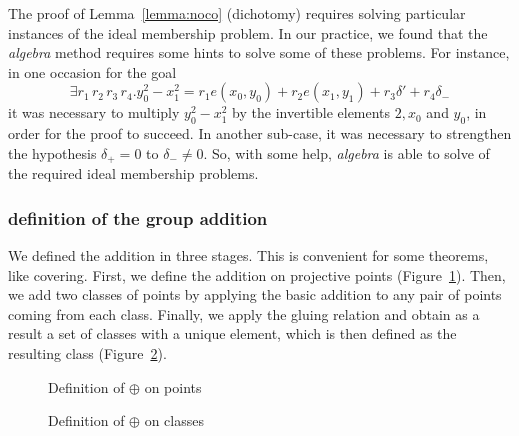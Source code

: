 \documentclass{llncs}
\begin{document}
The proof of Lemma~\ref{lemma:noco} (dichotomy) requires solving
particular instances of the ideal membership problem. In our practice,
we found that the \textit{algebra} method requires some hints to solve
some of these problems. For instance, in one occasion for the goal
\[
\exists r_1 \, r_2 \, r_3 \, r_4.
y_0^2 - x_1^2 = r_1 e(x_0,y_0) + r_2 e(x_1,y_1) + r_3 \delta' + r_4
\delta_{-} 
\] 
it was necessary to multiply $y_0^2 - x_1^2$ by the
invertible elements $2,x_0$ and $y_0$, in order for the proof to
succeed. In another sub-case, it was necessary to strengthen the
hypothesis $\delta_{+} = 0$ to $\delta_{-} \neq 0$. So, with some
help, \textit{algebra} is able to solve of the required ideal
membership problems.


\subsubsection{definition of the group addition}

We defined the addition in three stages. This is convenient for some
theorems, like covering. First, we define the addition on projective
points (Figure~\ref{fig3}). Then, we add two classes of points by
applying the basic addition to any pair of points coming from each
class. Finally, we apply the gluing relation and obtain as a result a
set of classes with a unique element, which is then defined as the
resulting class (Figure~\ref{fig4}).



\begin{figure}
{}
\caption{Definition of $\oplus$ on points}
\label{fig3}
\end{figure}
\begin{figure}
	{}
	{}
	\caption{Definition of $\oplus$ on classes}
	\label{fig4}
\end{figure}

\end{document}

